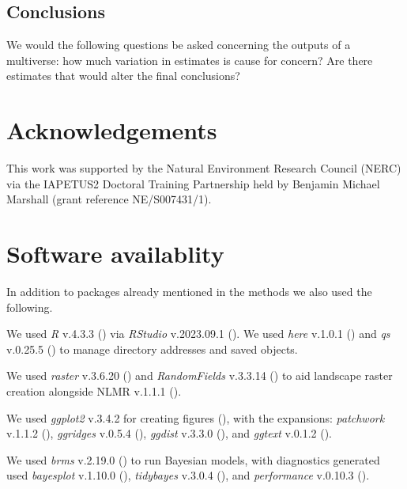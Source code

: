 \documentclass[10pt,a4paper]{article}
\begin{document}
\subsection{Conclusions}\label{conclusions}

We would the following questions be asked concerning the outputs of a multiverse: how much variation in estimates is cause for concern? Are there estimates that would alter the final conclusions?

\section{Acknowledgements}\label{acknowledgements}

This work was supported by the Natural Environment Research Council (NERC) via the IAPETUS2 Doctoral Training Partnership held by Benjamin Michael Marshall (grant reference NE/S007431/1).

\section{Software availablity}\label{software-availablity}

In addition to packages already mentioned in the methods we also used the following.

We used \emph{R} v.4.3.3 () via \emph{RStudio} v.2023.09.1 ().
We used \emph{here} v.1.0.1 () and \emph{qs} v.0.25.5 () to manage directory addresses and saved objects.

We used \emph{raster} v.3.6.20 () and \emph{RandomFields} v.3.3.14 () to aid landscape raster creation alongside NLMR v.1.1.1 ().

We used \emph{ggplot2} v.3.4.2 for creating figures (), with the expansions: \emph{patchwork} v.1.1.2 (), \emph{ggridges} v.0.5.4 (), \emph{ggdist} v.3.3.0 (), and \emph{ggtext} v.0.1.2 ().

We used \emph{brms} v.2.19.0 () to run Bayesian models, with diagnostics generated used \emph{bayesplot} v.1.10.0 (), \emph{tidybayes} v.3.0.4 (), and \emph{performance} v.0.10.3 ().
\end{document}
